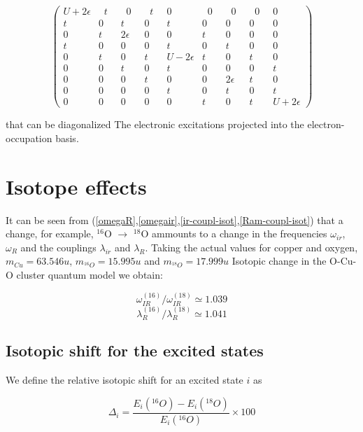 \begin{equation} \left( \begin{array}{ccccccccc} 
U+2\epsilon &\;\;t\;\;&\;\;0\;\;&\;\;t\;\;&0&\;\;0\;\;&\;\;0\;\;&\;\;0\;\;&0 \\
t&0&t&0&t&0&0&0&0 \\
0&t&2\epsilon &0&0&t&0&0&0 \\
t&0&0&0&t&0&t&0&0 \\
0&t&0&t&U-2\epsilon &t&0&t&0 \\
0&0&t&0&t&0&0&0&t \\
0&0&0&t&0&0&2\epsilon &t&0 \\
0&0&0&0&t&0&t&0&t \\
0&0&0&0&0&t&0&t&U+2\epsilon  \end{array} \right)\end{equation}

that can be diagonalized The electronic excitations projected into the electron-occupation basis.

\section{Isotope effects}

It can be seen from (\ref{omegaR},\ref{omegair},\ref{ir-coupl-isot},\ref{Ram-coupl-isot}) that a change, for example, $^{16}$O $\rightarrow$ $^{18}$O ammounts to a change in the frequencies  $\omega_{ir}$, $\omega_R$ and the couplings $\lambda_{ir}$ and $\lambda_R$. Taking the actual values for copper and oxygen, $m_{Cu}=63.546u$, $m_{^{16}O}=15.995u$ and $m_{^{18}O}=17.999u$ Isotopic change in the O-Cu-O cluster quantum model we obtain:

\begin{equation}\label{omega-ir-isot} \omega^{(16)}_{IR} / \omega^{(18)}_{IR} \simeq 1.039 \end{equation}
\begin{equation}\label{lambda-ir-isot} \lambda_R^{(16)} / \lambda_R^{(18)} \simeq 1.041 \end{equation}

\subsection{Isotopic shift for the excited states}

We define the relative isotopic shift for an excited state $i$ as 

\begin{equation}\label{isot-shift-def-exc}
\Delta_i = \frac{E_i(^{16}O)- E_i(^{18}O)}{E_i(^{16}O)} \times 100 \end{equation}

